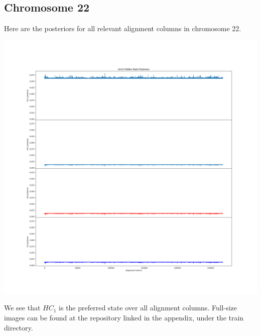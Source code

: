 \documentclass[12pt]{article}
\begin{document}
        \subsection{Chromosome 22}
        Here are the posteriors for all relevant alignment columns in chromosome 22.
        {\centering\includegraphics[width=1.\textwidth]{train/chr22_posteriors}\par}
        We see that $HC_1$ is the preferred state over all alignment columns. Full-size images can be found at the repository linked in the appendix, under the train directory.
\end{document}
